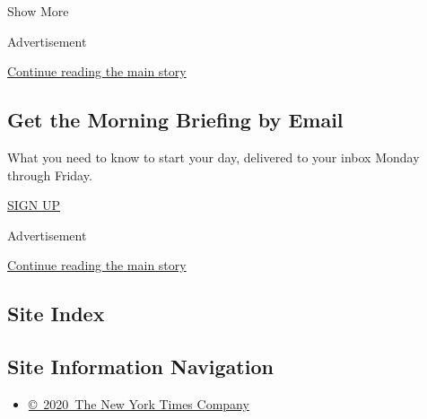 Show More

Advertisement

\protect\hyperlink{after-mid1}{Continue reading the main story}

\hypertarget{get-the-morning-briefing-by-email}{%
\subsection{Get the Morning Briefing by
Email}\label{get-the-morning-briefing-by-email}}

What you need to know to start your day, delivered to your inbox Monday
through Friday.

\href{https://www.nytimes3xbfgragh.onion/interactive/2018/briefing/global-morning-briefing-newsletter-signup.html}{SIGN
UP}

Advertisement

\protect\hyperlink{after-mktg}{Continue reading the main story}

\hypertarget{site-index}{%
\subsection{Site Index}\label{site-index}}

\hypertarget{site-information-navigation}{%
\subsection{Site Information
Navigation}\label{site-information-navigation}}

\begin{itemize}
\tightlist
\item
  \href{https://help.nytimes3xbfgragh.onion/hc/en-us/articles/115014792127-Copyright-notice}{©~2020~The
  New York Times Company}
\end{itemize}

